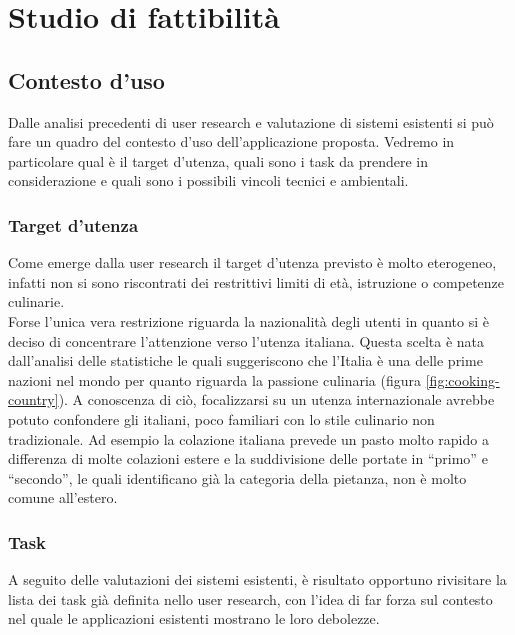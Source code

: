 \section{Studio di fattibilità}

\subsection{Contesto d'uso}
Dalle analisi precedenti di user research e valutazione di sistemi
esistenti si può fare un quadro del contesto d'uso dell'applicazione
proposta.
Vedremo in particolare qual è il target d'utenza, quali sono i task da
prendere in considerazione e quali sono i possibili vincoli tecnici e
ambientali.

\subsubsection{Target d'utenza}
Come emerge dalla user research il target d'utenza previsto è molto
eterogeneo, infatti non si sono riscontrati dei restrittivi limiti di
età, istruzione o competenze culinarie.\\
Forse l'unica vera restrizione riguarda la nazionalità degli utenti
in quanto si è deciso di concentrare
l'attenzione verso l'utenza italiana. Questa scelta è nata dall'analisi
delle statistiche le quali suggeriscono che l'Italia è una delle
prime nazioni nel mondo per quanto riguarda la passione culinaria
(figura \ref{fig:cooking-country}). A conoscenza di ciò, focalizzarsi su un
utenza internazionale avrebbe potuto confondere gli italiani, poco familiari
con lo stile culinario non tradizionale. Ad esempio la colazione
italiana prevede un pasto molto rapido a differenza di molte colazioni
estere e la suddivisione delle portate in ``primo'' e ``secondo'', le quali
identificano già la categoria della pietanza, non è molto comune
all'estero.

\subsubsection{Task}
A seguito delle valutazioni dei sistemi esistenti, è risultato opportuno
rivisitare la lista dei task già definita nello user research, con
l'idea di far forza sul contesto nel quale le applicazioni esistenti
mostrano le loro debolezze.

